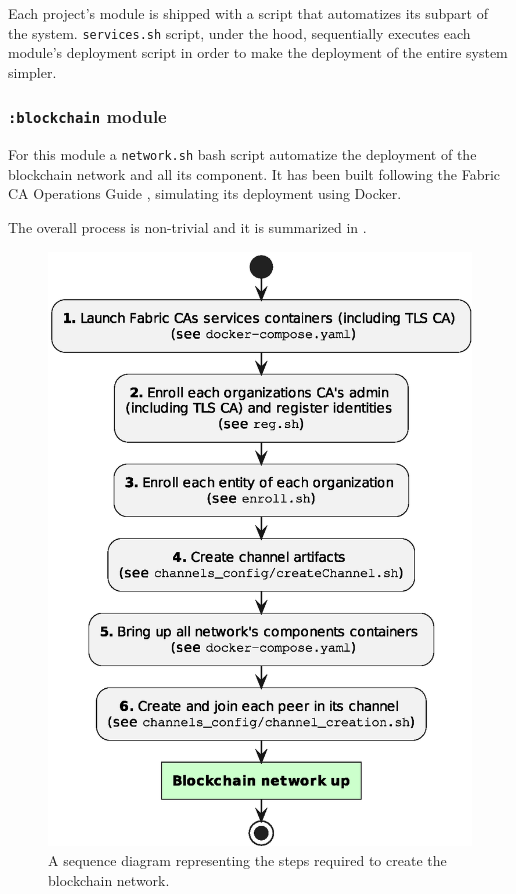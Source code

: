 \documentclass{scrartcl}
\begin{document}
Each project's module is shipped with a script that automatizes its subpart of the system.
%
\texttt{services.sh} script, under the hood, sequentially executes each module's deployment script in order to make the deployment of the entire system simpler.

\subsubsection*{\texttt{:blockchain} module}

For this module a \texttt{network.sh} bash script automatize the deployment of the blockchain network and all its component.
%
It has been built following the Fabric CA Operations Guide \cite{hyperledger-fabric-ca-docs} \cite{fabric-ca-rework}, simulating its deployment using Docker.

The overall process is non-trivial and it is summarized in .

\begin{figure}
    \centering
    \includegraphics[width=0.6\linewidth]{figures/blockchain-up-sequence.eps}
    \caption{A sequence diagram representing the steps required to create the blockchain network.}
    \label{fig:blockchain-up-sequence}
\end{figure}
\end{document}
